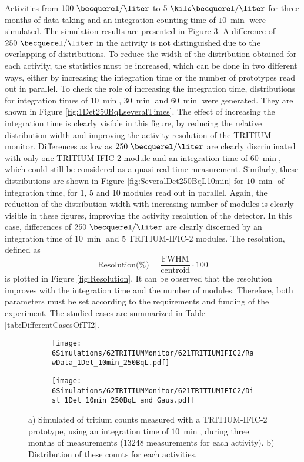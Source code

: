 Activities from $100~\becquerel/\liter$ to $5~\kilo\becquerel/\liter$ for three months of data taking and an integration counting time of $10~\min$ were simulated. The simulation results are presented in Figure \ref{fig:1Det10Min250BqL}. A difference of $250~\becquerel/\liter$ in the activity is not distinguished due to the overlapping of distributions. To reduce the width of the distribution obtained for each activity, the statistics must be increased, which can be done in two different ways, either by increasing the integration time or the number of prototypes read out in parallel. To check the role of increasing the integration time, distributions for integration times of $10~\min$, $30~\min$ and $60~\min$ were generated. They are shown in Figure \ref{fig:1Det250BqLseveralTimes}. The effect of increasing the integration time is clearly visible in this figure, by reducing the relative distribution width and improving the activity resolution of the TRITIUM monitor. Differences as low as $250~\becquerel/\liter$ are clearly discriminated with only one TRITIUM-IFIC-2 module and an integration time of $60~\min$, which could still be considered as a quasi-real time measurement. Similarly, these distributions are shown in Figure \ref{fig:SeveralDet250BqL10min} for $10~\min$ of integration time, for 1, 5 and 10 modules read out in parallel. Again, the reduction of the distribution width with increasing number of modules is clearly visible in these figures, improving the activity resolution of the detector. In this case, differences of $250~\becquerel/\liter$ are clearly discerned by an integration time of $10~\min$ and 5 TRITIUM-IFIC-2 modules. The resolution, defined as
\begin{equation}
\text{Resolution(\%)}=\frac{\text{FWHM}}{\text{centroid}}\cdot{}100
\label{eq:Resolution}
\end{equation}
is plotted in Figure \ref{fig:Resolution}. It can be observed that the resolution improves with the integration time and the number of modules. Therefore, both parameters must be set according to the requirements and funding of the experiment. The studied cases are summarized in Table \ref{tab:DifferentCasesOfTI2}.


\begin{figure}
\centering
    \begin{subfigure}[b]{0.7\textwidth}
    \centering
    \texttt{[image: 6Simulations/62TRITIUMMonitor/621TRITIUMIFIC2/RawData\_1Det\_10min\_250BqL.pdf]}  
    \caption{\label{subfig:RawData1Det10Min250BqL}}
    \end{subfigure}
    \hfill
    \begin{subfigure}[b]{0.7\textwidth}
    \centering
    \texttt{[image: 6Simulations/62TRITIUMMonitor/621TRITIUMIFIC2/Dist\_1Det\_10min\_250BqL\_and\_Gaus.pdf]}  
    \caption{\label{subfig:Dist1Det10Min250BqL}}
    \end{subfigure}
 \caption{a) Simulated of tritium counts measured with a TRITIUM-IFIC-2 prototype, using an integration time of $10~\min$, during three months of measurements ($13248$ measurements for each activity). b) Distribution of these counts for each activities.}
 \label{fig:1Det10Min250BqL}
\end{figure}

